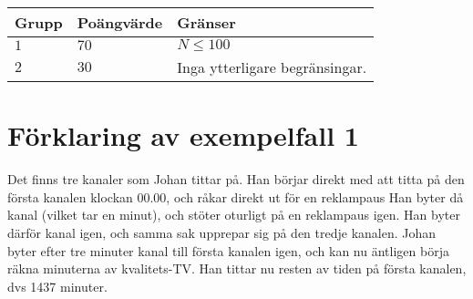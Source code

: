 \noindent
\begin{tabular}{| l | l | p{12cm} |}
  \hline
  Grupp & Poängvärde & Gränser \\ \hline
  $1$    & $70$        & $N \leq 100 $ \\ \hline 
  $2$    & $30$        & Inga ytterligare begränsingar. \\ \hline 
\end{tabular}

\section*{Förklaring av exempelfall 1}
Det finns tre kanaler som Johan tittar på. Han börjar direkt med att titta på den första kanalen klockan 00.00, och råkar direkt ut för en reklampaus
Han byter då kanal (vilket tar en minut), och stöter oturligt på en reklampaus igen.
Han byter därför kanal igen, och samma sak upprepar sig på den tredje kanalen.
Johan byter efter tre minuter kanal till första kanalen igen, och kan nu äntligen börja räkna minuterna av kvalitets-TV.
Han tittar nu resten av tiden på första kanalen, dvs 1437 minuter.
